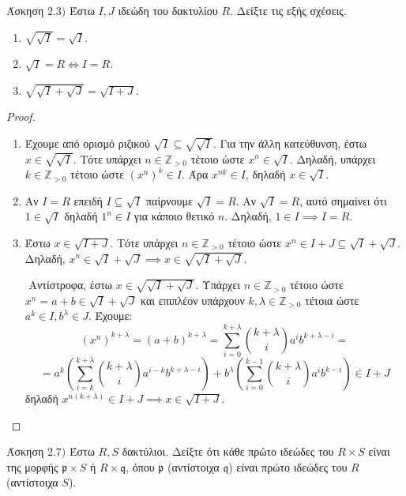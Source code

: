 \documentclass[oneside,a4paper]{article}
\newcommand{\Z}{\mathbb{Z}}
\begin{document}
\pagebreak

\noindent Άσκηση $2.3)$
\quad Έστω $I,J$ ιδεώδη του δακτυλίου $R$. Δείξτε τις εξής σχέσεις.
\begin{enumerate}
    \item $\sqrt{\sqrt I} = \sqrt I$.
    \item $\sqrt{I} = R \iff I = R$.
    \item $\sqrt{\sqrt I + \sqrt J} = \sqrt{I+J}$.
\end{enumerate}

\begin{proof} $ $
	$ $\newline
	\begin{enumerate}
        \item Έχουμε από ορισμό ριζικού $ \sqrt I \subseteq \sqrt{\sqrt I}$. Για την άλλη κατεύθυνση, έστω $x \in \sqrt{\sqrt I}$. Τότε υπάρχει $n \in \Z_{>0}$ τέτοιο ώστε $x^n \in \sqrt I$. Δηλαδή, υπάρχει $k \in \mathbb{Z}_{>0}$ τέτοιο ώστε $(x^n)^k \in I$. Άρα $x^{nk} \in I$, δηλαδή $x \in \sqrt I$.
        \item Αν $I = R$ επειδή $I \subseteq \sqrt I$ παίρνουμε $\sqrt I = R$. Αν $\sqrt I = R$, αυτό σημαίνει ότι $1 \in \sqrt I$ δηλαδή $1^n \in I$ για κάποιο θετικό $n$. Δηλαδή, $1 \in I \implies I = R$.
        \item Έστω $x \in \sqrt{I+J}$. Τότε υπάρχει $n \in \Z_{>0}$ τέτοιο ώστε $x^n \in I + J \subseteq \sqrt I + \sqrt J$. Δηλαδή, $x^n \in \sqrt I + \sqrt J \implies x \in \sqrt{\sqrt I + \sqrt J}$.
        
        $ $\newline
        Αντίστροφα, έστω $x \in \sqrt{\sqrt I + \sqrt J}$. Υπάρχει $n \in \Z_{>0}$ τέτοιο ώστε $x^n = a + b \in \sqrt I + \sqrt J$ και επιπλέον υπάρχουν $k,\lambda \in \Z_{>0}$ τέτοια ώστε $a^k \in I, b^{\lambda} \in J$. Έχουμε:
        $$(x^n)^{k+\lambda} = (a+b)^{k+\lambda} = \sum\limits_{i=0}^{k+\lambda } \binom{k+\lambda}{i} a^i b^{k+\lambda - i} = $$
        $$ = a^k \left(\sum\limits_{i = k}^{k + \lambda} \binom{k+\lambda}{i}a^{i-k}b^{k+\lambda - i}\right) + b^{\lambda} \left(\sum\limits_{i = 0}^{k -1 } \binom{k+\lambda}{i}a^{i}b^{k - i}\right) \in I + J$$
        δηλαδή $x^{n(k+\lambda)} \in I + J \implies x \in \sqrt{I + J}$.
    \end{enumerate}
\end{proof}
\pagebreak


\noindent Άσκηση $2.7)$
\quad Έστω $R,S$ δακτύλιοι. Δείξτε ότι κάθε πρώτο ιδεώδες του $R\times S$ είναι της μορφής $\mathfrak{p} \times S$ ή $R \times \mathfrak{q}$, όπου $\mathfrak{p}$ (αντίστοιχα $\mathfrak{q}$) είναι πρώτο ιδεώδες του $R$ (αντίστοιχα $S$).
\end{document}
